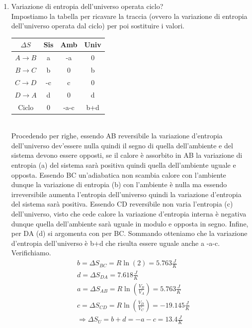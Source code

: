 \documentclass[
10pt, %
a4paper, %
oneside, %
headinclude,footinclude, %
BCOR5mm, %
]{scrartcl}
\begin{document}
\begin{exercise}
\begin{enumerate}
		\item Variazione di entropia dell'universo operata ciclo?\\
		Impostiamo la tabella per ricavare la traccia (ovvero la variazione di entropia dell'universo operata dal ciclo) per poi sostituire i valori. 
		\begin{table}[h!]
			\begin{center}
				\begin{tabular}{ || c| c | c| c|| }
					\hline
					\(\Delta S\) & Sis& Amb& Univ\\
					\hline
					\(A\rightarrow B\)& a  &-a  &0  \\
					\(B\rightarrow C\)& b   &0   &b\\
					\(C\rightarrow D\)& -c    &c   &0\\
					\(D\rightarrow A\)& d   &0   &d\\
					\hline
					Ciclo             & 0      & -a-c & b+d  \\
					\hline
				\end{tabular}
			\end{center}
		\end{table}\\
		Procedendo per righe, essendo AB reversibile la variazione d'entropia dell'universo dev'essere nulla quindi il segno di quella dell'ambiente e del sistema devono essere opposti, se il calore è assorbito in AB la variazione di entropia (a) del sistema sarà positiva quindi quella dell'ambiente uguale e opposta. Essendo BC un'adiabatica non scambia calore con l'ambiente dunque la variazione di entropia (b) con l'ambiente è nulla ma essendo irreversibile aumenta l'entropia dell'universo quindi la variazione d'entropia del sistema sarà positiva. Essendo CD reversibile non varia l'entropia (c) dell'universo, visto che cede calore la variazione d'entropia interna è negativa dunque quella dell'ambiente sarà uguale in modulo e opposta in segno. Infine, per DA (d) si argomenta con per BC. Sommando otteniamo che la variazione d'entropia dell'universo è b+d che risulta essere uguale anche a -a-c. Verifichiamo.
		\begin{align*}
			&b =\Delta S_{BC}=R\ln\left(2\right)=5.763 \frac{J}{K}\\
			&d =\Delta S_{DA}=7.618 \frac{J}{K}\\
			&a =\Delta S_{AB}=R\ln\left(\frac{V_{B}}{V_{A}}\right)=5.763 \frac{J}{K}\\
			&c =\Delta S_{CD}=R\ln\left(\frac{V_{D}}{V_{C}}\right)=-19.145 \frac{J}{K}\\
			&\Rightarrow \Delta S_U = b+d = -a-c = 13.4\frac{J}{K}
		\end{align*}
	\end{enumerate}
\end{exercise}
\end{document}
